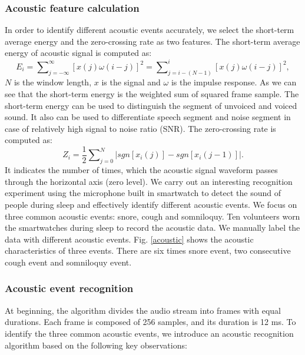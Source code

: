 \subsubsection*{Acoustic feature calculation}
In order to identify different acoustic events accurately, we select the short-term average energy and the zero-crossing rate as two features. The short-term average energy of acoustic signal is computed as:
\begin{equation}
  E_i=\sum\nolimits_{j=-\infty}^{\infty}[x(j)\omega(i-j)]^2=\sum\nolimits_{j=i-(N-1)}^{i}[x(j)\omega(i-j)]^2,
\end{equation}
$N$ is the window length, $x$ is the signal and $\omega$ is the impulse response. As we can see that the short-term energy is the weighted
sum of squared frame sample. The short-term energy can be used to distinguish the segment of unvoiced and voiced sound. It also can be used
to differentiate speech segment and noise segment  in  case of relatively high signal to noise ratio (SNR). The zero-crossing rate is
computed as:
\begin{equation}
  Z_i = \frac{1}{2}\sum\nolimits_{j=0}^{N}|sgn[x_i(j)]-sgn[x_i(j-1)]|.
\end{equation}
It indicates the number of times, which the acoustic signal waveform passes through the horizontal axis (zero level). We carry out an interesting recognition experiment using the microphone built in smartwatch to detect the sound of people during sleep and effectively identify different acoustic events. We focus on three common acoustic events: snore, cough and somniloquy. Ten volunteers worn the smartwatches during sleep to record the acoustic data. We manually label the data with different acoustic events. Fig. \ref{acoustic} shows the acoustic characteristics of  three events. There are six times snore event, two consecutive cough event and somniloquy event.


\subsubsection*{Acoustic event recognition}
 At beginning, the algorithm  divides the audio stream into frames with equal durations. Each frame is composed of 256 samples, and its duration is 12 ms. To identify the  three common acoustic events, we introduce an acoustic recognition algorithm based on the following key observations:

